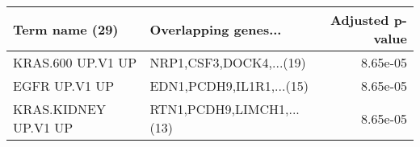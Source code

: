\begin{tabular}{llr}
\toprule
      Term name (29) &      Overlapping genes... &  Adjusted p-value \\
\midrule
   KRAS.600 UP.V1 UP &   NRP1,CSF3,DOCK4,...(19) &          8.65e-05 \\
       EGFR UP.V1 UP &  EDN1,PCDH9,IL1R1,...(15) &          8.65e-05 \\
KRAS.KIDNEY UP.V1 UP & RTN1,PCDH9,LIMCH1,...(13) &          8.65e-05 \\
\bottomrule
\end{tabular}
